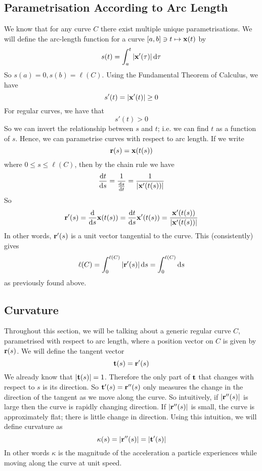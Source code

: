 \documentclass{article}
\begin{document}
\subsection{Parametrisation According to Arc Length}
We know that for any curve $C$ there exist multiple unique parametrisations. We will define the arc-length function for a curve $[a, b] \ni t \mapsto \vb x(t)$ by
\[ s(t) = \int_a^t \abs{\vb x'(\tau)} \,\dd \tau \]
So $s(a) = 0, s(b) = \ell(C)$. Using the Fundamental Theorem of Calculus, we have
\[ s'(t) = \abs{\vb x'(t)} \geq 0 \]
For regular curves, we have that
\[ s'(t) > 0 \]
So we can invert the relationship between $s$ and $t$; i.e. we can find $t$ as a function of $s$. Hence, we can parametrise curves with respect to arc length. If we write
\[ \vb r(s) = \vb x(t(s)) \]
where $0 \leq s \leq \ell(C)$, then by the chain rule we have
\[ \frac{\dd{t}}{\dd{s}} = \frac{1}{\frac{\dd{s}}{\dd{t}}} = \frac{1}{\abs{\vb x'(t(s))}} \]
So
\[ \vb r'(s) = \frac{\dd}{\dd{s}} \vb x(t(s)) = \frac{\dd{t}}{\dd{s}} \vb x'(t(s)) = \frac{\vb x'(t(s))}{\abs{\vb x'(t(s))}} \]
In other words, $\vb r'(s)$ is a unit vector tangential to the curve. This (consistently) gives
\[ \ell(C) = \int_0^{\ell(C)} \abs{\vb r'(s)} \dd{s} = \int_0^{\ell(C)} \dd{s} \]
as previously found above.

\subsection{Curvature}
Throughout this section, we will be talking about a generic regular curve $C$, parametrised with respect to arc length, where a position vector on $C$ is given by $\vb r(s)$. We will define the tangent vector
\[ \vb t(s) = \vb r'(s) \]
We already know that $\abs{\vb t(s)} = 1$. Therefore the only part of $\vb t$ that changes with respect to $s$ is its direction. So $\vb t'(s) = \vb r''(s)$ only measures the change in the direction of the tangent as we move along the curve. So intuitively, if $\abs{\vb r''(s)}$ is large then the curve is rapidly changing direction. If $\abs{\vb r''(s)}$ is small, the curve is approximately flat; there is little change in direction. Using this intuition, we will define curvature as
\[ \kappa(s) = \abs{\vb r''(s)} = \abs{\vb t'(s)} \]
In other words $\kappa$ is the magnitude of the acceleration a particle experiences while moving along the curve at unit speed.
\end{document}

